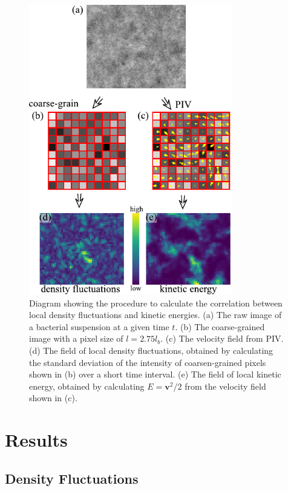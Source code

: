 \begin{figure}[!]
	\begin{center}
		\includegraphics[width=3.5in]{Figs/5-GNF/local-correlation.pdf}
		\caption[Density autocorrelation]
		{
			Diagram showing the procedure to calculate the correlation between local density fluctuations and kinetic energies. (a) The raw image of a bacterial suspension at a given time $t$. (b) The coarse-grained image with a pixel size of $l=2.75l_b$. (c) The velocity field from PIV. (d) The field of local density fluctuations, obtained by calculating the standard deviation of the intensity of coarsen-grained pixels shown in (b) over a short time interval. (e) The field of local kinetic energy, obtained by calculating $E = \bm{v}^2/2$ from the velocity field shown in (c).
 		}
		\label{fig:coupling-calculation}
	\end{center}
\end{figure}





\section{Results}
\subsection{Density Fluctuations}

